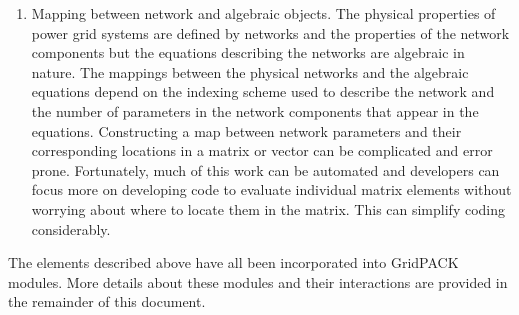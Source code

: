 \begin{enumerate}
\item  Mapping between network and algebraic objects. The physical properties of power grid systems are defined by networks and the properties of the network components but the equations describing the networks are algebraic in nature. The mappings between the physical networks and the algebraic equations depend on the indexing scheme used to describe the network and the number of parameters in the network components that appear in the equations. Constructing a map between network parameters and their corresponding locations in a matrix or vector can be complicated and error prone. Fortunately, much of this work can be automated and developers can focus more on developing code to evaluate individual matrix elements without worrying about where to locate them in the matrix. This can simplify coding considerably.
\end{enumerate}

The elements described above have all been incorporated into GridPACK modules. More details about these modules and their interactions are provided in the remainder of this document.
